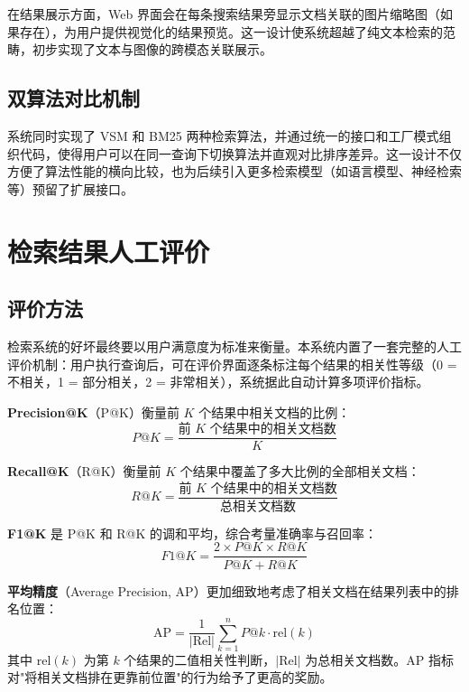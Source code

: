\documentclass[12pt, a4paper]{ctexart}
\begin{document}
在结果展示方面，Web 界面会在每条搜索结果旁显示文档关联的图片缩略图（如果存在），为用户提供视觉化的结果预览。这一设计使系统超越了纯文本检索的范畴，初步实现了文本与图像的跨模态关联展示。

\subsection{双算法对比机制}

系统同时实现了 VSM 和 BM25 两种检索算法，并通过统一的接口和工厂模式组织代码，使得用户可以在同一查询下切换算法并直观对比排序差异。这一设计不仅方便了算法性能的横向比较，也为后续引入更多检索模型（如语言模型、神经检索等）预留了扩展接口。


\section{检索结果人工评价}

\subsection{评价方法}

检索系统的好坏最终要以用户满意度为标准来衡量。本系统内置了一套完整的人工评价机制：用户执行查询后，可在评价界面逐条标注每个结果的相关性等级（0 = 不相关，1 = 部分相关，2 = 非常相关），系统据此自动计算多项评价指标。

\textbf{Precision@K}（P@K）衡量前 $K$ 个结果中相关文档的比例：
\begin{equation}
    P@K = \frac{\text{前 } K \text{ 个结果中的相关文档数}}{K}
\end{equation}

\textbf{Recall@K}（R@K）衡量前 $K$ 个结果中覆盖了多大比例的全部相关文档：
\begin{equation}
    R@K = \frac{\text{前 } K \text{ 个结果中的相关文档数}}{\text{总相关文档数}}
\end{equation}

\textbf{F1@K} 是 P@K 和 R@K 的调和平均，综合考量准确率与召回率：
\begin{equation}
    F1@K = \frac{2 \times P@K \times R@K}{P@K + R@K}
\end{equation}

\textbf{平均精度}（Average Precision, AP）更加细致地考虑了相关文档在结果列表中的排名位置：
\begin{equation}
    \text{AP} = \frac{1}{|\text{Rel}|} \sum_{k=1}^{n} P@k \cdot \text{rel}(k)
\end{equation}
其中 $\text{rel}(k)$ 为第 $k$ 个结果的二值相关性判断，$|\text{Rel}|$ 为总相关文档数。AP 指标对"将相关文档排在更靠前位置"的行为给予了更高的奖励。
\end{document}
